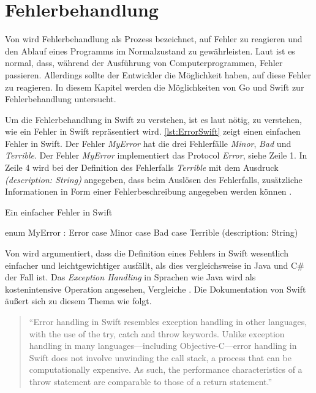 \chapter{Fehlerbehandlung}
Von \cite[S.310]{Apple.2017} wird Fehlerbehandlung als Prozess bezeichnet, auf Fehler zu reagieren und den Ablauf eines Programms im Normalzustand zu gewährleisten.
Laut \cite[S.77]{Manning.2016} ist es normal, dass, während der Ausführung von Computerprogrammen, Fehler passieren. 
Allerdings sollte der Entwickler die Möglichkeit haben, auf diese Fehler zu reagieren. 
In diesem Kapitel werden die Möglichkeiten von Go und Swift zur Fehlerbehandlung untersucht.


Um die Fehlerbehandlung in Swift zu verstehen, ist es laut \cite[S.175]{Hoffman.2017} nötig, zu verstehen, wie ein Fehler in Swift repräsentiert wird.
\autoref{lst:ErrorSwift} zeigt einen einfachen Fehler in Swift.
Der Fehler \textit{MyError} hat die drei Fehlerfälle \textit{Minor}, \textit{Bad} und \textit{Terrible}.
Der Fehler \textit{MyError} implementiert das Protocol \textit{Error}, siehe Zeile 1. 
In Zeile 4 wird bei der Definition des Fehlerfalls \textit{Terrible} mit dem Ausdruck \textit{(description: String)} angegeben, dass beim Auslösen des Fehlerfalls, zusätzliche Informationen in Form einer Fehlerbeschreibung angegeben werden können \cite[S.175]{Hoffman.2017}.

\begin{listing}
\caption{Ein einfacher Fehler in Swift \cite[S.175]{Hoffman.2017}}
\label{lst:ErrorSwift}
\begin{SwiftCode}
enum MyError : Error {
    case Minor
    case Bad 
    case Terrible (description: String)
}
\end{SwiftCode}
\end{listing}

Von \cite[S.175]{Hoffman.2017} wird argumentiert, dass die Definition eines Fehlers in Swift wesentlich einfacher und leichtgewichtiger ausfällt, als dies vergleichsweise in Java und C\# der Fall ist.
Das \textit{Exception Handling} in Sprachen wie Java wird als kostenintensive Operation angesehen, Vergleiche \cite[]{JavaExceptions}. 
Die Dokumentation von Swift äußert sich zu diesem Thema wie folgt.

\begin{quote}
\enquote{Error handling in Swift resembles exception handling in other languages, with the use of the try, catch and throw
keywords. Unlike exception handling in many languages—including Objective-C—error handling in Swift does not involve
unwinding the call stack, a process that can be computationally expensive. As such, the performance characteristics of a
throw statement are comparable to those of a return statement.} \cite[S.311]{Apple.2017}
\end{quote}

